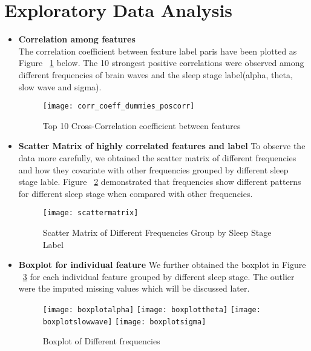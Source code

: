 \section*{Exploratory Data Analysis}
\begin{itemize}
\item \textbf{Correlation among features} \\
The correlation coefficient between feature label paris have been plotted as Figure ~\ref{fig:corrs} below. The 10 strongest positive correlations were observed among different frequencies of brain waves and the sleep stage label(alpha, theta, slow wave and sigma). \\
\begin{figure}[h!]
  \texttt{[image: corr\_coeff\_dummies\_poscorr]}
  \caption{Top 10 Cross-Correlation coefficient between features}
  \label{fig:corrs}
\end{figure}

\item \textbf{Scatter Matrix of highly correlated features and label}
To observe the data more carefully, we obtained the scatter matrix of different frequencies and how they covariate with other frequencies grouped by different sleep stage lable. Figure ~\ref{fig:scatter} demonstrated that frequencies show different patterns for different sleep stage when compared with other frequencies.\\
\begin{figure}[h!]
  \texttt{[image: scattermatrix]}
  \caption{Scatter Matrix of Different Frequencies Group by Sleep Stage Label}
  \label{fig:scatter}
\end{figure}
\item \textbf{Boxplot for individual feature}
We further obtained the boxplot in Figure ~\ref{fig:boxplot} for each individual feature grouped by different sleep stage. The outlier were the imputed missing values which will be discussed later. \\
 \begin{figure}[ht]
  \texttt{[image: boxplotalpha]}
  \texttt{[image: boxplottheta]}
  \texttt{[image: boxplotslowwave]}
  \texttt{[image: boxplotsigma]}
  \caption{Boxplot of Different frequencies}
  \label{fig:boxplot}
\end{figure} 
\end{itemize} 

